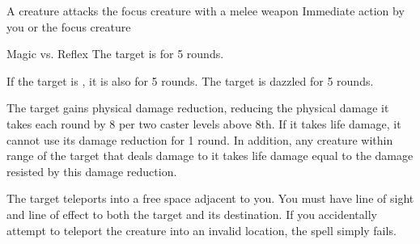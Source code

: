\begin{spellheader}
    \spellrng{\rngclose}
\end{spellheader}
\begin{spelleffects}
    \begin{spelltrigger}{A creature attacks the focus creature with a melee weapon}
         Immediate action by you or the focus creature
        \spellrng{\rngclose}
        \begin{spellattack}{Magic vs. Reflex}
            \spellsuccess The target is \dazzled for 5 rounds.

            If the target is \bloodied, it is also \blinded for 5 rounds.
            \spellfailure The target is dazzled for 5 rounds.
        \end{spellattack}
    \end{spelltrigger}
\end{spelleffects}
\begin{spellfooter}

\end{spellfooter}

\begin{spellheader}
    \spellrng{\rngclose}
    \spelldur{\durshort}
\end{spellheader}
\begin{spelleffects}
    \spelleffect The target gains physical damage reduction, reducing the physical damage it takes each round by 8  per two caster levels above 8th. If it takes life damage, it cannot use its damage reduction for 1 round. In addition, any creature within \rngmed range of the target that deals damage to it takes life damage equal to the damage resisted by this damage reduction.
\end{spelleffects}
\begin{spellfooter}

\end{spellfooter}

\begin{spellheader}
    \spellrng{\rngmed}
\end{spellheader}
\begin{spelleffects}
    \spelleffect The target teleports into a free space adjacent to you. You must have line of sight and line of effect to both the target and its destination. If you accidentally attempt to teleport the creature into an invalid location, the spell simply fails.
\end{spelleffects}
\begin{spellfooter}

\end{spellfooter}

